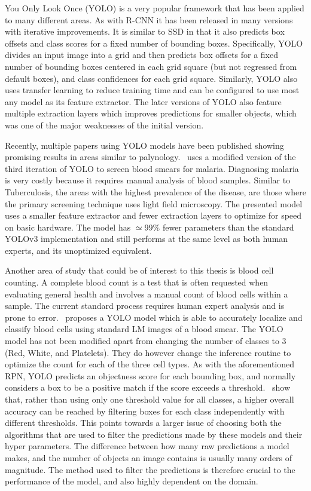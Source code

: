 You Only Look Once (YOLO) is a very popular framework that has been applied to many different areas.
As with R-CNN it has been released in many versions with iterative improvements.
It is similar to SSD in that it also predicts box offsets and class scores for a fixed number of bounding boxes.
Specifically, YOLO divides an input image into a grid and then predicts box offsets for a fixed number of bounding boxes centered in each grid square (but not regressed from default boxes), and class confidences for each grid square.
Similarly, YOLO also uses transfer learning to reduce training time and can be configured to use most any model as its feature extractor.
The later versions of YOLO also feature multiple extraction layers which improves predictions for smaller objects, which was one of the major weaknesses of the initial version.

Recently, multiple papers using YOLO models have been published showing promising results in areas similar to palynology.\ \textcite{chibuta_real_time_2020} uses a modified version of the third iteration of YOLO to screen blood smears for malaria.
Diagnosing malaria is very costly because it requires manual analysis of blood samples.
Similar to Tuberculosis, the areas with the highest prevalence of the disease, are those where the primary screening technique uses light field microscopy.
The presented model uses a smaller feature extractor and fewer extraction layers to optimize for speed on basic hardware.
The model has \( \simeq 99\% \) fewer parameters than the standard YOLOv3 implementation and still performs at the same level as both human experts, and its unoptimized equivalent.

Another area of study that could be of interest to this thesis is blood cell counting.
A complete blood count is a test that is often requested when evaluating general health and involves a manual count of blood cells within a sample.
The current standard process requires human expert analysis and is prone to error.\ \textcite{islam_machine_2019} proposes a YOLO model which is able to accurately localize and classify blood cells using standard LM images of a blood smear.
The YOLO model has not been modified apart from changing the number of classes to 3 (Red, White, and Platelets).
They do however change the inference routine to optimize the count for each of the three cell types.
As with the aforementioned RPN, YOLO predicts an objectness score for each bounding box, and normally considers a box to be a positive match if the score exceeds a threshold.\ \citeauthor{islam_machine_2019} show that, rather than using only one threshold value for all classes, a higher overall accuracy can be reached by filtering boxes for each class independently with different thresholds.
This points towards a larger issue of choosing both the algorithms that are used to filter the predictions made by these models and their hyper parameters.
The difference between how many raw predictions a model makes, and the number of objects an image contains is usually many orders of magnitude.
The method used to filter the predictions is therefore crucial to the performance of the model, and also highly dependent on the domain.

